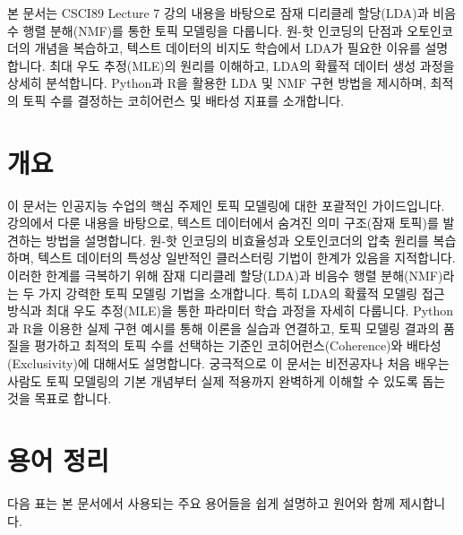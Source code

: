 \documentclass[11pt,a4paper]{article}
\begin{document}
\begin{summarybox}
본 문서는 CSCI89 Lecture 7 강의 내용을 바탕으로 잠재 디리클레 할당(LDA)과 비음수 행렬 분해(NMF)를 통한 토픽 모델링을 다룹니다.
원-핫 인코딩의 단점과 오토인코더의 개념을 복습하고, 텍스트 데이터의 비지도 학습에서 LDA가 필요한 이유를 설명합니다.
최대 우도 추정(MLE)의 원리를 이해하고, LDA의 확률적 데이터 생성 과정을 상세히 분석합니다.
Python과 R을 활용한 LDA 및 NMF 구현 방법을 제시하며, 최적의 토픽 수를 결정하는 코히어런스 및 배타성 지표를 소개합니다.
\end{summarybox}

\newpage
\section*{개요}
이 문서는 인공지능 수업의 핵심 주제인 토픽 모델링에 대한 포괄적인 가이드입니다.
강의에서 다룬 내용을 바탕으로, 텍스트 데이터에서 숨겨진 의미 구조(잠재 토픽)를 발견하는 방법을 설명합니다.
원-핫 인코딩의 비효율성과 오토인코더의 압축 원리를 복습하며, 텍스트 데이터의 특성상 일반적인 클러스터링 기법이 한계가 있음을 지적합니다.
이러한 한계를 극복하기 위해 잠재 디리클레 할당(LDA)과 비음수 행렬 분해(NMF)라는 두 가지 강력한 토픽 모델링 기법을 소개합니다.
특히 LDA의 확률적 모델링 접근 방식과 최대 우도 추정(MLE)을 통한 파라미터 학습 과정을 자세히 다룹니다.
Python과 R을 이용한 실제 구현 예시를 통해 이론을 실습과 연결하고, 토픽 모델링 결과의 품질을 평가하고 최적의 토픽 수를 선택하는 기준인 코히어런스(Coherence)와 배타성(Exclusivity)에 대해서도 설명합니다.
궁극적으로 이 문서는 비전공자나 처음 배우는 사람도 토픽 모델링의 기본 개념부터 실제 적용까지 완벽하게 이해할 수 있도록 돕는 것을 목표로 합니다.

\newpage
\section*{용어 정리}
다음 표는 본 문서에서 사용되는 주요 용어들을 쉽게 설명하고 원어와 함께 제시합니다.
\end{document}
